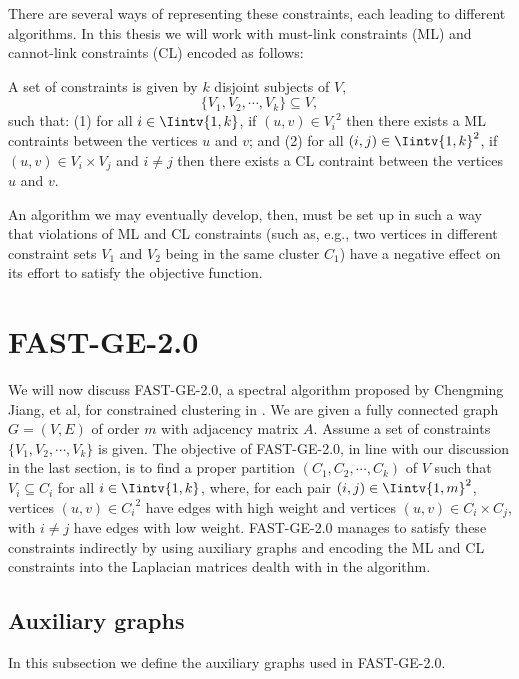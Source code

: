 There are several ways of representing these constraints, each leading to different algorithms. 
In this thesis we will work with must-link constraints (ML) and cannot-link constraints (CL) encoded as follows:

A set of constraints is given by $k$ disjoint subjects of $V$,
\begin{equation}
   \{ V_1, V_2, \cdots, V_k \} \subseteq V,
\end{equation}
such that: (1) for all $i \in \Iintv{1,k}$, if $(u,v) \in {V_i}^2$ then there exists a ML contraints between the vertices $u$ and $v$; and (2) for all $(i,j) \in \Iintv{1,k}^2$, if $(u,v) \in V_i \times V_j$ and $i \ne j$ then there exists a CL contraint between the vertices $u$ and $v$. 

An algorithm we may eventually develop, then, must be set up in such a way that violations of ML and CL constraints (such as, e.g., two vertices in different constraint sets $V_1$ and $V_2$ being in the same cluster $C_1$) have a negative effect on its effort to satisfy the objective function.

\section{FAST-GE-2.0}
We will now discuss FAST-GE-2.0, a spectral algorithm proposed by Chengming Jiang, et al, for constrained clustering in \cite{fastge2}.
We are given a fully connected graph $G = (V,E)$ of order $m$ with adjacency matrix $A$.
Assume a set of constraints $\{V_1, V_2, \cdots, V_k \}$ is given.
The objective of FAST-GE-2.0, in line with our discussion in the last section, is to find a proper partition $(C_1, C_2, \cdots, C_k)$ of $V$ such that $V_i \subseteq C_i$ for all $i \in \Iintv{1,k}$, where, for each pair $(i,j) \in \Iintv{1,m}^2$, vertices $(u,v) \in {C_i}^2$ have edges with high weight and vertices $(u,v) \in {C_i} \times {C_j}$, with $i \ne j$ have edges with low weight.
FAST-GE-2.0 manages to satisfy these constraints indirectly by using auxiliary graphs and encoding the ML and CL constraints into the Laplacian matrices dealth with in the algorithm.

\subsection{Auxiliary graphs}
In this subsection we define the auxiliary graphs used in FAST-GE-2.0.

